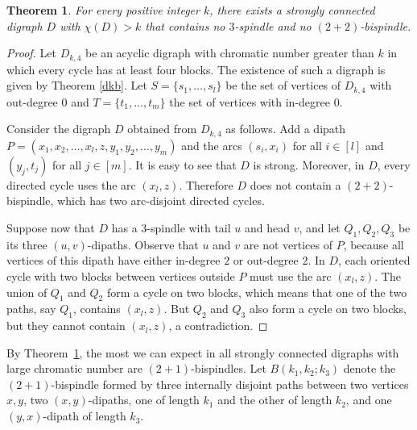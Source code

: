 \documentclass[utf8,10pt]{article}
\theoremstyle{plain}
\newtheorem{theorem}{Theorem}
\theoremstyle{definition}
\theoremstyle{remark}
\begin{document}
\begin{theorem}\label{thm:no}
For every positive integer $k$, there exists a strongly connected digraph $D$ with $\chi(D) >k$ that contains no $3$-spindle and no $(2+2)$-bispindle. 
\end{theorem}

\begin{proof}
Let $D_{k,4}$ be an acyclic digraph with chromatic number greater than $k$ in which every cycle has at least four blocks. The existence of such a digraph is given by Theorem \ref{dkb}.
Let $S = \{s_1, \dots,  s_l\}$ be the set of vertices of $D_{k,4}$ with out-degree 0 and $T = \{t_1, \dots, t_m\}$ the set of vertices with in-degree 0.

Consider the digraph $D$ obtained from $D_{k,4}$ as follows. Add a dipath  $P = (x_1,x_2, \dots , x_l,z,y_1,y_2,\dots, y_m)$ and the arcs $(s_i,x_i)$ for all $i\in [l]$ and
$(y_j,t_j)$ for all $j\in [m]$. It is easy to see that $D$ is strong.
Moreover, in $D$, every directed cycle uses the arc $(x_l,z)$. Therefore $D$ does not contain a $(2+2)$-bispindle, which has two arc-disjoint directed cycles. 

Suppose now that $D$ has a $3$-spindle with tail $u$ and head $v$, and let $Q_1, Q_2, Q_3$ be its three $(u,v)$-dipaths. Observe that $u$ and $v$ are not vertices of $P$, because all vertices of this dipath have either in-degree $2$ or out-degree $2$. In $D$, each oriented cycle with two blocks between vertices outside $P$ must use the arc $(x_l,z)$. The union of $Q_1$ and $Q_2$ form a cycle on two blocks, 
which means that one of the two paths, say $Q_1$, contains $(x_l,z)$. But $Q_2$ and $Q_3$ also form a cycle on two blocks, but they cannot contain $(x_l,z)$, a contradiction.
\end{proof}





By Theorem~\ref{thm:no}, the most we can expect in all strongly connected digraphs with large chromatic number are $(2+1)$-bispindles.
Let $B(k_1,k_2;k_3)$ denote the $(2+1)$-bispindle formed by three internally disjoint paths between two vertices $x,y$,
two $(x,y)$-dipaths, one of length $k_1$ and the other of length $k_2$, and one $(y,x)$-dipath of length $k_3$.
\end{document}
